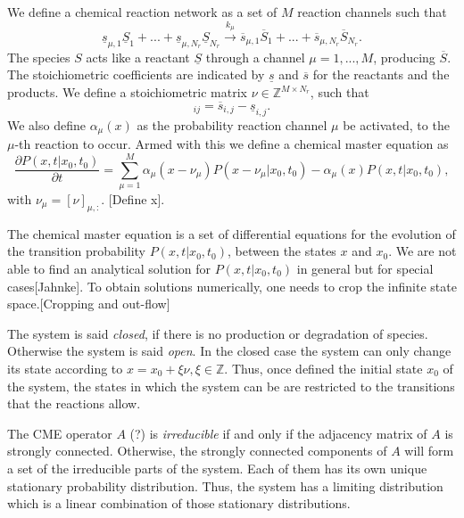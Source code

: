 \documentclass[conference]{IEEEtran}
\begin{document}
We define a chemical reaction network as a set of $M$ reaction channels such that
%
\begin{equation}
\underline{s}_{\mu,1}\underline{S}_1 + ... + \underline{s}_{\mu,N_r}\underline{S}_{N_r} \overset{k_\mu}{\longrightarrow} \overline{s}_{\mu,1}\overline{S}_1 + ... + \overline{s}_{\mu,N_r}\overline{S}_{N_r}.
\end{equation}
%
The species $S$ acts like a reactant $\underline{S}$ through a channel $\mu = 1,...,M$, producing $\overline{S}$. The stoichiometric coefficients are indicated by $\underline{s}$ and $\overline{s}$ for the reactants and the products. We define a stoichiometric matrix $\nu \in \mathbb{Z}^{M \times N_r}$, such that
%
\begin{equation}
[\nu]_{ij} = \overline{s}_{i,j} - \underline{s}_{i,j}.
\end{equation}
%
We also define $\alpha_{\mu}(x)$ as the probability reaction channel $\mu$ be activated\cite{Gillespie}, to the $\mu$-th reaction to occur. Armed with this we define a chemical master equation as
%
\begin{equation}
\label{eq CME}
\frac{\partial P(x,t | x_0, t_0)}{\partial t} = \sum_{\mu = 1}^M \alpha_\mu(x - \nu_\mu) P(x - \nu_\mu | x_0,t_0) - \alpha_\mu(x) P(x,t|x_0,t_0),
\end{equation}
%
with $\nu_\mu = [\nu]_{\mu,:}$. [Define x].

The chemical master equation is a set of differential equations for the evolution of the transition probability $P(x,t | x_0, t_0)$, between the states $x$ and $x_0$. We are not able to find an analytical solution for $P(x,t | x_0, t_0)$ in general but for special cases[Jahnke]. To obtain solutions numerically, one needs to crop the infinite state space.[Cropping and out-flow]

The system is said {\it closed}, if there is no production or degradation of species. Otherwise the system is said {\it open}. In the closed case the system can only change its state according to $x = x_0 + \xi \nu, \xi \in \mathbb{Z}$. Thus, once defined the initial state $x_0$ of the system, the states in which the system can be are restricted to the transitions that the reactions allow.

The CME operator $A$ (?) is {\it irreducible} if and only if the adjacency matrix of $A$ is strongly connected\cite{Brualdi}. Otherwise, the strongly connected components of $A$ will form a set of the irreducible parts of the system. Each of them has its own unique stationary probability distribution. Thus, the system has a limiting distribution which is a linear combination of those stationary distributions.
\end{document}
